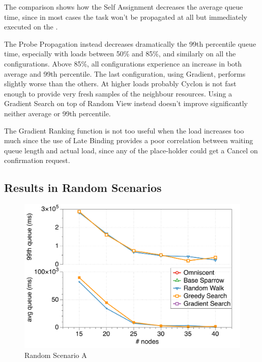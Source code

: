 \documentclass[conference]{IEEEtran}
\begin{document}
The comparison shows how the Self Assignment decreases the average queue time, since in most cases the task won't be propagated at all but immediately executed on the \tmast.

The Probe Propagation instead decreases dramatically the 99th percentile queue time, especially with loads between 50\% and 85\%, and similarly on all the configurations. Above 85\%, all configurations experience an increase in both average and 99th percentile. The last configuration, using Gradient, performs slightly worse than the others. At higher loads probably Cyclon is not fast enough to provide very fresh samples of the neighbour resources. Using a Gradient Search on top of Random View instead doesn't improve significantly neither average or 99th percentile.

The Gradient Ranking function is not too useful when the load increases too much since the use of Late Binding provides a poor correlation between waiting queue length and actual load, since any of the place-holder could get a Cancel on confirmation request.

\subsection{Results in Random Scenarios}

\begin{figure}
\begin{center}
\includegraphics[scale=0.45]{figures/randomA}
\caption{Random Scenario A}
\label{fig:comparison}
\end{center}
\end{figure}
\end{document}
